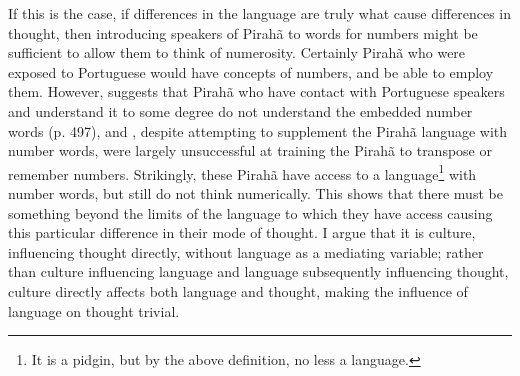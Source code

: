 \documentclass[doc,12pt]{apa6}
\begin{document}
If this is the case, if differences in the language are truly what cause
differences in thought, then introducing speakers of Pirahã to words for
numbers might be sufficient to allow them to think of numerosity. Certainly
Pirah\~{a} who were exposed to Portuguese would have concepts of numbers, and
be able to employ them. However,  suggests that Pirah\~{a} who
have contact with Portuguese speakers and understand it to some degree do not
understand the embedded number words (p. 497), and , despite
attempting to supplement the Pirah\~{a} language with number words, were
largely unsuccessful at training the Pirah\~{a} to transpose or remember
numbers. 
Strikingly, these Pirah\~{a} have access to a language\footnote{It is a pidgin,
but by the above definition, no less a language.} with number words, but still
do not think numerically. 
This shows that there must be something beyond the limits of the language to
which they have access causing this particular difference in their mode of
thought. I argue that it is culture, influencing thought directly, without
language as a mediating variable; rather than culture influencing language and
language subsequently influencing thought, culture directly affects both
language and thought, making the influence of language on thought trivial.
\end{document}
